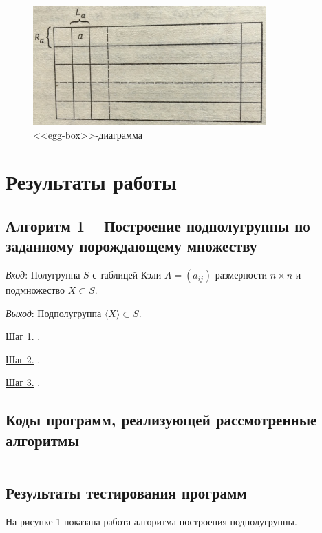 \documentclass[bachelor, och, labwork]{shiza}
\begin{document}
      \begin{figure}[H]
        \centering
        \includegraphics[width=0.8\textwidth]{photo/egg-box.png}
        \caption{<<egg-box>>-диаграмма}
      \end{figure}

\section{Результаты работы}
    \subsection{Алгоритм 1 -- Построение подполугруппы по заданному порождающему множеству}

    \textit{Вход}: Полугруппа $S$ с таблицей Кэли $A = (a_{ij})$ размерности $n \times n$ и подмножество $X \subset
    S$.

    \textit{Выход}: Подполугруппа $\langle X \rangle \subset S$.
    
    \underline{Шаг 1.} .    
    
    \underline{Шаг 2.} .
    
    \underline{Шаг 3.} .
    

        \subsection{Коды программ, реализующей рассмотренные алгоритмы}

        \inputminted[fontsize=\small]{python}{code/aua-lab5.py}

      \newpage
      
      \subsection{Результаты тестирования программ}
      
      На рисунке 1 показана работа алгоритма построения подполугруппы.
\end{document}
